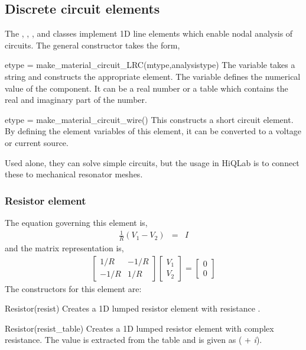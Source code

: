 \clearpage
\subsection{Discrete circuit elements}
The , , , and 
classes implement 1D line elements which enable nodal
analysis of circuits. 
The general constructor takes the form,
\begin{codelist}

  \item[etype = make\_material\_circuit\_LRC(mtype,analysistype)]
  The variable  takes a string 
   and constructs the appropriate
  element.
  The variable  defines the numerical value of the component.
  It can be a real number or a table which contains the real and imaginary
  part of the number.

  \item[etype = make\_material\_circuit\_wire()]
  This constructs a short circuit element. By defining the element
  variables of this element, it can be converted to a voltage or current
  source.

\end{codelist}
Used alone, they can solve simple circuits, but
the usage in HiQLab is to connect these to mechanical resonator meshes.

\subsubsection*{Resistor element}
The equation governing this element is,
\begin{eqnarray}
\frac{1}{R}\left(V_1-V_2\right) &=& I
\end{eqnarray}
  and the matrix representation is,
\begin{eqnarray}
\left[
\begin{array}{rr}
 1/R & -1/R   \\
-1/R &  1/R
\end{array}
\right]
\left[
\begin{array}{c}
{V}_1 \\
{V}_2
\end{array}
\right]
=
\left[
\begin{array}{c}
0 \\
0
\end{array}
\right]
\end{eqnarray}
The constructors for this element are:
\begin{codelist}

  \item[Resistor(resist)] 
  Creates a 1D lumped resistor element with resistance . 

  \item[Resistor(resist\_table)] 
  Creates a 1D lumped resistor element
  with complex resistance. The value is extracted from the table
   and is given as
  ( + {\it i}).

\end{codelist}

